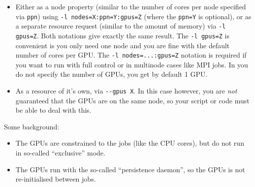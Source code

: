 \begin{itemize}
  \item Either as a node property (similar to the number of cores
  per node specified via \lstinline|ppn|) using \lstinline|-l nodes=X:ppn=Y:gpus=Z| (where the \lstinline|ppn=Y| is optional),
  or as a separate resource request (similar to the amount of memory) via \lstinline|-l gpus=Z|.
  Both notations give exactly the same result.
  The \lstinline|-l gpus=Z| is convenient is you only need one
  node and you are fine with the default number of cores per GPU.
  The \lstinline|-l nodes=...:gpus=Z| notation is required if you want to run with full control or in multinode cases like MPI jobs.
  In you do not specify the number of GPUs, you get by default 1 GPU.
\item As a resource of it's own, via \lstinline|--gpus X|.
  In this case however, you are \emph{not} guaranteed that the GPUs are on the same node,
  so your script or code must be able to deal with this.
\end{itemize}

Some background:
\begin{itemize}
\item The GPUs are constrained to the jobs (like the CPU cores), but do not run in so-called ``exclusive'' mode.
\item The GPUs run with the so-called ``persistence daemon'', so the GPUs is not re-initialised between jobs.
\end{itemize}


